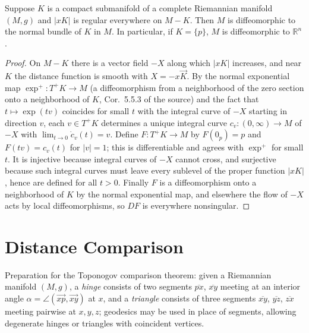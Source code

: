 \begin{corollary}
  \label{cor:pet-ch12-normal-bundle-diffeomorphism}
  Suppose $K$ is a compact submanifold of a complete Riemannian manifold $(M,g)$
  and $|xK|$ is regular everywhere on $M-K$. Then $M$ is diffeomorphic to the
  normal bundle of $K$ in $M$. In particular, if $K=\{p\}$, $M$ is diffeomorphic
  to $\mathbb{R}^n$.
\end{corollary}
\begin{proof}
  On $M-K$ there is a vector field $-X$ along which $|xK|$ increases, and near
  $K$ the distance function is smooth with $X=-x\vec K$. By the normal
  exponential map $\exp^+:T^+K\to M$ (a diffeomorphism from a neighborhood of the
  zero section onto a neighborhood of $K$, Cor.\ 5.5.3 of the source) and the
  fact that $t\mapsto\exp(tv)$ coincides for small $t$ with the integral curve of
  $-X$ starting in direction $v$, each $v\in T^+K$ determines a unique integral
  curve $c_v:(0,\infty)\to M$ of $-X$ with $\lim_{t\to0}\dot c_v(t)=v$. Define
  $F:T^+K\to M$ by $F(0_p)=p$ and $F(tv)=c_v(t)$ for $|v|=1$; this is
  differentiable and agrees with $\exp^+$ for small $t$. It is injective because
  integral curves of $-X$ cannot cross, and surjective because such integral
  curves must leave every sublevel of the proper function $|xK|$, hence are
  defined for all $t>0$. Finally $F$ is a diffeomorphism onto a neighborhood of
  $K$ by the normal exponential map, and elsewhere the flow of $-X$ acts by local
  diffeomorphisms, so $DF$ is everywhere nonsingular.
\end{proof}

\section{Distance Comparison}

Preparation for the Toponogov comparison theorem: given a Riemannian manifold
$(M,g)$, a \emph{hinge} consists of two segments $\overline{px}$, $\overline{xy}$
meeting at an interior angle $\alpha=\angle(\overrightarrow{xp},\overrightarrow{xy})$
at $x$, and a \emph{triangle} consists of three segments $\overline{xy}$,
$\overline{yz}$, $\overline{zx}$ meeting pairwise at $x,y,z$; geodesics may be
used in place of segments, allowing degenerate hinges or triangles with
coincident vertices.

